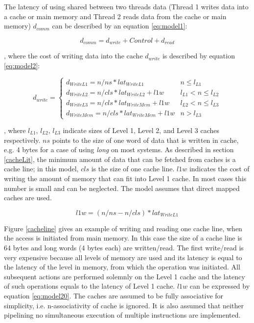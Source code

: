 The latency of using shared between two threads data (Thread 1 writes data into a cache or main memory and Thread 2 reads data from the cache or main memory) $d_{comm}$ can be described by an equation \eqref{eq:model1}:

\begin{equation}\label{eq:model1}
d_{comm} = d_{write} + Control + d_{read}
\end{equation}

, where the cost of writing data into the cache $d_{write}$ is described by equation \eqref{eq:model2}:

\begin{equation}\label{eq:model2}
d_{write} = \begin{cases}d_{WriteL1}= n/ns * lat_{WriteL1} & n \leq l_{L1}\\d_{WriteL2} = n/cls * lat_{WriteL2} + l1w & l_{L1} < n \leq l_{L2}\\d_{WriteL3} = n/cls * lat_{WriteMem} + l1w & l_{L2} < n \leq l_{L3}\\d_{WriteMem} = n/cls * lat_{WriteMem} + l1w & n > l_{L3}\end{cases}
\end{equation}

, where $l_{L1}$, $l_{L2}$, $l_{L3}$ indicate sizes of Level 1, Level 2, and Level 3 caches respectively. $ns$ points to the size of one word of data that is written in cache, e.g. 4 bytes for a case of using \textit{long} on most systems. As described in section \ref{cacheLit}, the minimum amount of data that can be fetched from caches is a cache line; in this model, $cls$ is the size of one cache line. $l1w$ indicates the cost of writing the amount of memory that can fit into Level 1 cache. In most cases this number is small and can be neglected. The model assumes that direct mapped caches are used.

\begin{equation}\label{eq:model20}
l1w = (n/ns - n/cls) *  lat_{WriteL1}
\end{equation}

Figure \ref{cacheline} gives an example of writing and reading one cache line, when the access is initiated from main memory. In this case the size of a cache line is 64 bytes and long words (4 bytes each) are written/read. The first write/read is very expensive because all levels of memory are used and its latency is equal to the latency of the level in memory, from which the operation was initiated. All subsequent actions are performed solemnly on the Level 1 cache and the latency of such operations equals to the latency of Level 1 cache. $l1w$ can be expressed by equation \ref{eq:model20}. The caches are assumed to be fully associative for simplicity, i.e. n-associativity of cache is ignored. It is also assumed that neither pipelining no simultaneous execution of multiple instructions are implemented.

